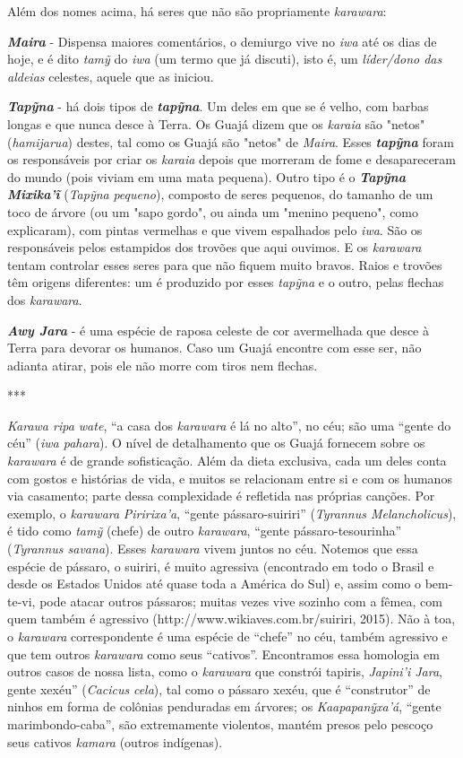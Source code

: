 Além dos nomes acima, há seres que não são propriamente \emph{karawara}:

\emph{\textbf{Maira}} - Dispensa maiores comentários, o demiurgo vive no
\emph{iwa} até os dias de hoje, e é dito \emph{tamỹ} do \emph{iwa} (um
termo que já discuti), isto é, um \emph{líder/dono das aldeias}
celestes, aquele que as iniciou.

\emph{\textbf{Tapỹna}} - há dois tipos de \emph{\textbf{tapỹna}}. Um
deles em que se é velho, com barbas longas e que nunca desce à Terra. Os
Guajá dizem que os \emph{karaia} são "netos" (\emph{hamijarua}) destes,
tal como os Guajá são "netos" de \emph{Maira}. Esses
\emph{\textbf{tapỹna}} foram os responsáveis por criar os \emph{karaia}
depois que morreram de fome e desapareceram do mundo (pois viviam em uma
mata pequena). Outro tipo é o \textbf{\emph{Tapỹna Mixika'ĩ}}
(\emph{Tapỹna} \emph{pequeno}), composto de seres pequenos, do tamanho
de um toco de árvore (ou um "sapo gordo", ou ainda um "menino pequeno",
como explicaram), com pintas vermelhas e que vivem espalhados pelo
\emph{iwa}. São os responsáveis pelos estampidos dos trovões que aqui
ouvimos. E os \emph{karawara} tentam controlar esses seres para que não
fiquem muito bravos. Raios e trovões têm origens diferentes: um é
produzido por esses \emph{tapỹna} e o outro, pelas flechas dos
\emph{karawara}.

\emph{\textbf{Awy Jara}} - é uma espécie de raposa celeste de cor
avermelhada que desce à Terra para devorar os humanos. Caso um Guajá
encontre com esse ser, não adianta atirar, pois ele não morre com tiros
nem flechas.

***

\emph{Karawa ripa wate}, ``a casa dos \emph{karawara} é lá no alto'', no
céu; são uma ``gente do céu'' (\emph{iwa pahara}). O nível de
detalhamento que os Guajá fornecem sobre os \emph{karawara} é de grande
sofisticação. Além da dieta exclusiva, cada um deles conta com gostos e
histórias de vida, e muitos se relacionam entre si e com os humanos via
casamento; parte dessa complexidade é refletida nas próprias canções.
Por exemplo, o \emph{karawara} \emph{Piririxa'a}, ``gente
pássaro-suiriri'' (\emph{Tyrannus Melancholicus}), é tido como
\emph{tamỹ} (chefe) de outro \emph{karawara}, ``gente
pássaro-tesourinha'' (\emph{Tyrannus savana}). Esses \emph{karawara}
vivem juntos no céu. Notemos que essa espécie de pássaro, o suiriri, é
muito agressiva (encontrado em todo o Brasil e desde os Estados Unidos
até quase toda a América do Sul) e, assim como o bem-te-vi, pode atacar
outros pássaros; muitas vezes vive sozinho com a fêmea, com quem também
é agressivo (http://www.wikiaves.com.br/suiriri, 2015). Não à toa, o
\emph{karawara} correspondente é uma espécie de ``chefe'' no céu, também
agressivo e que tem outros \emph{karawara} como seus ``cativos''.
Encontramos essa homologia em outros casos de nossa lista, como o
\emph{karawara} que constrói tapiris, \emph{Japini'i Jara}, gente
xexéu'' (\emph{Cacicus} \emph{cela}), tal como o pássaro xexéu, que é
``construtor'' de ninhos em forma de colônias penduradas em árvores; os
\emph{Kaapapanỹxa'á}, ``gente marimbondo-caba'', são extremamente
violentos, mantém presos pelo pescoço seus cativos \emph{kamara} (outros
indígenas).

